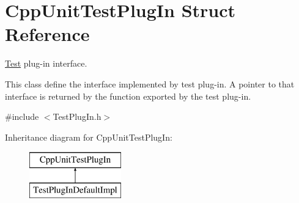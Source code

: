 \hypertarget{struct_cpp_unit_test_plug_in}{\section{Cpp\-Unit\-Test\-Plug\-In Struct Reference}
\label{struct_cpp_unit_test_plug_in}
}


\hyperlink{class_test}{Test} plug-\/in interface.

This class define the interface implemented by test plug-\/in. A pointer to that interface is returned by the function exported by the test plug-\/in.  




{\ttfamily \#include $<$Test\-Plug\-In.\-h$>$}

Inheritance diagram for Cpp\-Unit\-Test\-Plug\-In\-:\begin{figure}[H]
\begin{center}
\leavevmode
\includegraphics[height=2.000000cm]{struct_cpp_unit_test_plug_in}
\end{center}
\end{figure}
